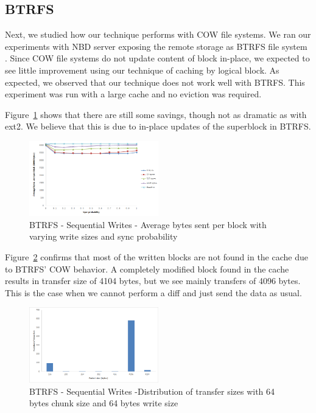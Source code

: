 \documentclass[10pt,twocolumn]{article}
\begin{document}
\subsection{BTRFS}
Next, we studied how our technique performs with COW file systems. We ran our
experiments with NBD server exposing the remote storage as BTRFS file system
\cite{rodeh12}. %
Since COW file systems do not update content of block in-place, we expected to
see little improvement using our technique of caching by logical block. As
expected, we observed that our technique does not work well with BTRFS. This
experiment was run with a large cache and no eviction was required. 

Figure~\ref{fig:btrfsseqwrite} shows that there are still some savings, though
not as dramatic as with ext2. %
We believe that this is due to in-place updates of the superblock in BTRFS.

\begin{figure}[htbp]
  \centering
  \includegraphics[width=0.50\textwidth]{figs/BTRFSSeqWrite.png}
  \caption{BTRFS - Sequential Writes - Average bytes sent per block with varying write sizes and sync probability}
  \label{fig:btrfsseqwrite}
\end{figure}

Figure~\ref{fig:btrfsseqdist} confirms that most of the written blocks are not
found in the cache due to BTRFS' COW behavior. %
A completely modified block found in the cache results in transfer size of 4104
bytes, but we see mainly transfers of 4096 bytes. %
This is the case when we cannot perform a diff and just send the data as usual. %

\begin{figure}[htbp]
  \centering
  \includegraphics[width=0.50\textwidth]{figs/BTRFSSeqDist.png}
  \caption{BTRFS - Sequential Writes -Distribution of transfer sizes with 64 bytes chunk size and 64 bytes write size}
  \label{fig:btrfsseqdist}
\end{figure}
\end{document}
